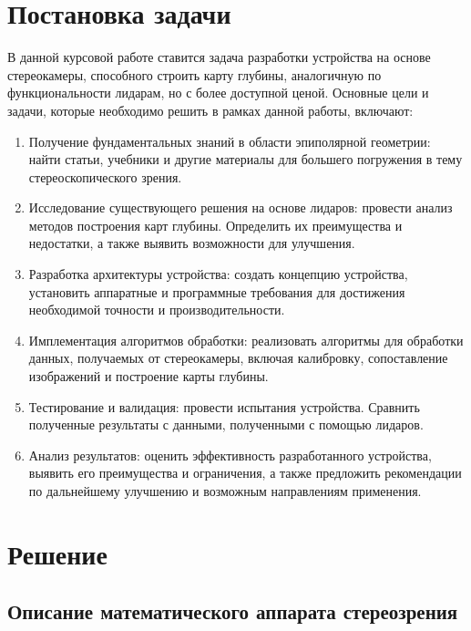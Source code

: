 \section{Постановка задачи}

В данной курсовой работе ставится задача разработки устройства на основе стереокамеры, способного строить карту глубины, аналогичную по функциональности лидарам, но с более доступной ценой. Основные цели и задачи, которые необходимо решить в рамках данной работы, включают:

\begin{enumerate}
    \item Получение фундаментальных знаний в области эпиполярной геометрии: найти статьи, учебники и другие материалы для большего погружения в тему стереоскопического зрения.

    \item Исследование существующего решения на основе лидаров: провести анализ методов построения карт глубины. Определить их преимущества и недостатки, а также выявить возможности для улучшения.

    \item Разработка архитектуры устройства: создать концепцию устройства, установить аппаратные и программные требования для достижения необходимой точности и производительности.

    \item Имплементация алгоритмов обработки: реализовать алгоритмы для обработки данных, получаемых от стереокамеры, включая калибровку, сопоставление изображений и построение карты глубины.

    \item Тестирование и валидация: провести испытания устройства. Сравнить полученные результаты с данными, полученными с помощью лидаров.

    \item Анализ результатов: оценить эффективность разработанного устройства, выявить его преимущества и ограничения, а также предложить рекомендации по дальнейшему улучшению и возможным направлениям применения.
\end{enumerate}




\newpage




\section{Решение}

\subsection{Описание математического аппарата стереозрения}

